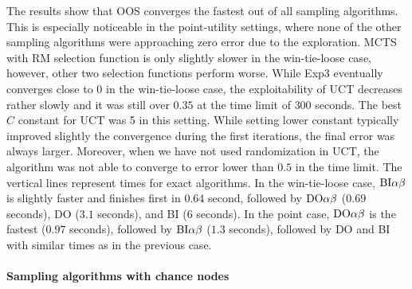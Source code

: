 The results show that OOS converges the fastest out of all sampling algorithms.
This is especially noticeable in the point-utility settings, where none of the other sampling algorithms were approaching zero error due to the exploration.
MCTS with RM selection function is only slightly slower in the win-tie-loose case, however, other two selection functions perform worse. 
While Exp3 eventually converges close to $0$ in the win-tie-loose case, the exploitability of UCT decreases rather slowly and it was still over $0.35$ at the time limit of $300$ seconds. 
The best $C$ constant for UCT was 5 in this setting. While setting lower constant typically improved slightly the 
convergence during the first iterations, the final error was always larger.
Moreover, when we have not used randomization in UCT, the algorithm was not able to converge to error lower than $0.5$ in the time limit. 
The vertical lines represent times for exact algorithms.
In the win-tie-loose case, $\textrm{BI}\alpha\beta$ is slightly faster and finishes first in $0.64$ second, followed by $\textrm{DO}\alpha\beta$ ($0.69$ seconds), \textsc{DO} ($3.1$ seconds), and \textsc{BI} ($6$ seconds).
In the point case, $\textrm{DO}\alpha\beta$ is the fastest ($0.97$ seconds), followed by $\textrm{BI}\alpha\beta$ ($1.3$ seconds), followed by \textsc{DO} and \textsc{BI} with similar times as in the previous case.

\paragraph{Sampling algorithms with chance nodes}

